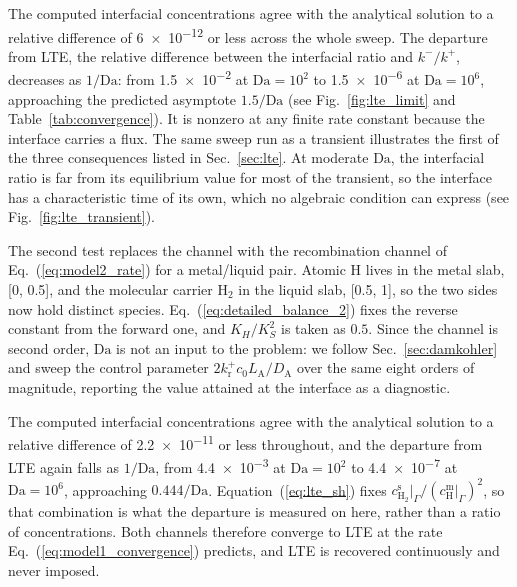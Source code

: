 \documentclass[5p]{elsarticle}
\newcommand{\Da}{\mathrm{Da}}
\newcommand{\cm}[1]{c^{\mathrm{m}}_{#1}}   %
\newcommand{\cs}[1]{c^{\mathrm{s}}_{#1}}   %
\begin{document}
The computed interfacial concentrations agree with the analytical solution to a relative difference of \num{6e-12} or less across the whole sweep.
The departure from LTE, the relative difference between the interfacial ratio and $k^{-}/k^{+}$, decreases as $1/\Da$: from \num{1.5e-2} at $\Da = 10^{2}$ to \num{1.5e-6} at $\Da = 10^{6}$, approaching the predicted asymptote $1.5/\Da$ (see Fig.~\ref{fig:lte_limit} and Table~\ref{tab:convergence}).
It is nonzero at any finite rate constant because the interface carries a flux.
The same sweep run as a transient illustrates the first of the three consequences listed in Sec.~\ref{sec:lte}. 
At moderate $\Da$, the interfacial ratio is far from its equilibrium value for most of the transient, so the interface has a characteristic time of its own, which no algebraic condition can express (see Fig.~\ref{fig:lte_transient}).

The second test replaces the channel with the recombination channel of Eq.~(\ref{eq:model2_rate}) for a metal/liquid pair.
Atomic H lives in the metal slab, [0, 0.5], and the molecular carrier $\mathrm{H_2}$ in the liquid slab, [0.5, 1], so the two sides now hold distinct species.
Eq.~(\ref{eq:detailed_balance_2}) fixes the reverse constant from the forward one, and $K_H/K_S^{2}$ is taken as $0.5$.
Since the channel is second order, $\Da$ is not an input to the problem: we follow Sec.~\ref{sec:damkohler} and sweep the control parameter $2k_\mathrm{r}^{+}c_0L_\mathrm{A}/D_\mathrm{A}$ over the same eight orders of magnitude, reporting the value attained at the interface as a diagnostic.

The computed interfacial concentrations agree with the analytical solution to a relative difference of \num{2.2e-11} or less throughout, and the departure from LTE again falls as $1/\Da$, from \num{4.4e-3} at $\Da = 10^{2}$ to \num{4.4e-7} at $\Da = 10^{6}$, approaching $0.444/\Da$.
Equation~(\ref{eq:lte_sh}) fixes $\cs{\mathrm{H_2}}|_\Gamma/(\cm{\mathrm{H}}|_\Gamma)^{2}$, so that combination is what the departure is measured on here, rather than a ratio of concentrations.
Both channels therefore converge to LTE at the rate Eq.~(\ref{eq:model1_convergence}) predicts, and LTE is recovered continuously and never imposed.
\end{document}
